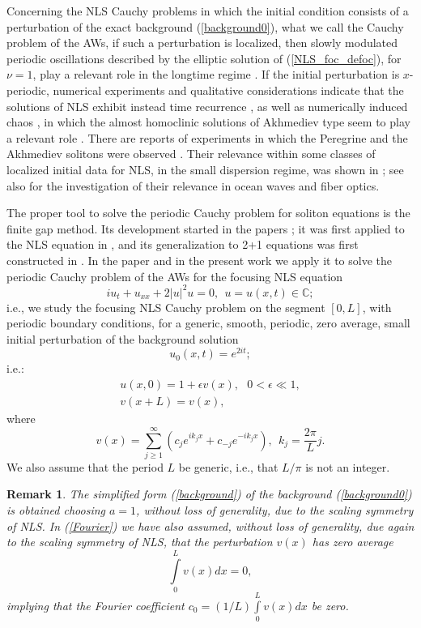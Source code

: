 \documentclass[12pt]{article}
\newcommand{\CC}{\mathbb C}
\newtheorem{remark}{Remark}
\newcommand{\beq}{\begin{equation}}
\newcommand{\eeq}{\end{equation}}
\newcommand{\ba}{\begin{array}}
\newcommand{\ea}{\end{array}}
\newcommand{\eps}{{\epsilon}}
\begin{document}
Concerning the NLS Cauchy problems in which the initial condition consists of a perturbation of the exact background (\ref{background0}), what we call the Cauchy problem of the AWs, if such a perturbation is localized, then slowly modulated periodic oscillations described by the elliptic solution of (\ref{NLS_foc_defoc}), for $\nu=1$, play a relevant role in the longtime regime \cite{Biondini1,Biondini2}. If the initial perturbation is $x$-periodic, numerical experiments and qualitative considerations indicate that the solutions of NLS exhibit instead time recurrence \cite{Yuen1,Yuen2,Yuen3,Akhmed3,Simaeys,Kuznetsov2}, as well as numerically induced chaos \cite{AblowHerbst,AblowSchobHerbst,AblowHHShober}, in which the almost homoclinic solutions of Akhmediev type seem to play a relevant role \cite{Ercolani,FL,CaliniEMcShober,CaliniShober1,CaliniShober2}. There are reports of experiments in which the Peregrine and the Akhmediev solitons were observed \cite{CHA_observP,KFFMDGA_observP,Yuen3,Tulin,Onor,trillo,PieranFZMAGSCDR}. Their relevance within some classes of localized initial data for NLS, in the small dispersion regime, was shown in \cite{BT,EKT}; see also \cite{GT,TBETB} for the investigation of their relevance in ocean waves and fiber optics.

The proper tool to solve the periodic Cauchy problem for soliton equations is the finite gap method. Its development started in the papers \cite{Novikov,Dubrovin,ItsMatveev,Lax,MKVM}; it was first applied to the NLS equation in \cite{ItsKotlj}, and its generalization to 2+1 equations was first constructed in \cite{Krichever}. In the paper \cite{GS1} and in the present work we apply it to solve the periodic Cauchy problem of the AWs for the focusing NLS equation 
\beq\label{NLS_foc}
i u_t +u_{xx}+2 |u|^2 u=0, \ \ u=u(x,t)\in\CC;
\eeq
i.e., we study the focusing NLS Cauchy problem on the segment $[0,L]$, with periodic boundary conditions, for a generic, smooth, periodic, zero average, small initial perturbation of the background solution
\beq\label{background}
u_0(x,t)=e^{2it};
\eeq
i.e.:
\beq\label{Cauchy}
\ba{l}
u(x,0)=1+\eps v(x), \ \ \ 0<\eps\ll 1,  \\ v(x+L)=v(x),
\ea
\eeq
where
\beq\label{Fourier}
v(x)=\sum\limits_{j\ge 1}^{\infty}\left(c_j e^{i k_j x}+c_{-j} e^{-i k_j x}\right), \ \ k_j=\frac{2\pi}{L}j .
\eeq
We also assume that the period $L$ be generic, i.e., that $L/\pi$ is not an integer.

\begin{remark}
The simplified form (\ref{background}) of the background (\ref{background0}) is obtained choosing $a=1$, without loss of generality, due to the scaling symmetry of NLS. In (\ref{Fourier}) we have also assumed, without loss of generality, due again to the scaling symmetry of NLS, that the perturbation $v(x)$ has zero average
\beq\label{zero_average}
\int\limits_{0}^L v(x)dx =0,
\eeq
implying that the Fourier coefficient $c_0=(1/L)\int\limits_{0}^L v(x)dx$ be zero. 
\end{remark}
\end{document}
